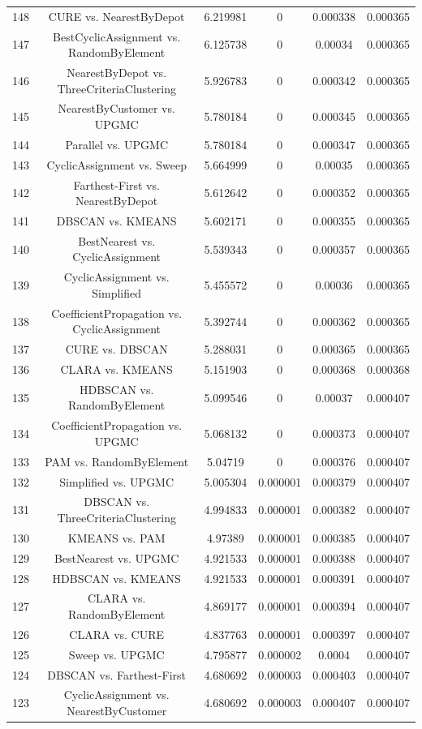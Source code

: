 \documentclass[a4paper,10pt]{article}
\begin{document}
\begin{landscape}
\begin{table}[!htp]
\begin{tabular}{cccccc}
148&CURE vs. NearestByDepot&6.219981&0&0.000338&0.000365\\
147&BestCyclicAssignment vs. RandomByElement&6.125738&0&0.00034&0.000365\\
146&NearestByDepot vs. ThreeCriteriaClustering&5.926783&0&0.000342&0.000365\\
145&NearestByCustomer vs. UPGMC&5.780184&0&0.000345&0.000365\\
144&Parallel vs. UPGMC&5.780184&0&0.000347&0.000365\\
143&CyclicAssignment vs. Sweep&5.664999&0&0.00035&0.000365\\
142&Farthest-First vs. NearestByDepot&5.612642&0&0.000352&0.000365\\
141&DBSCAN vs. KMEANS&5.602171&0&0.000355&0.000365\\
140&BestNearest vs. CyclicAssignment&5.539343&0&0.000357&0.000365\\
139&CyclicAssignment vs. Simplified&5.455572&0&0.00036&0.000365\\
138&CoefficientPropagation vs. CyclicAssignment&5.392744&0&0.000362&0.000365\\
137&CURE vs. DBSCAN&5.288031&0&0.000365&0.000365\\
136&CLARA vs. KMEANS&5.151903&0&0.000368&0.000368\\
135&HDBSCAN vs. RandomByElement&5.099546&0&0.00037&0.000407\\
134&CoefficientPropagation vs. UPGMC&5.068132&0&0.000373&0.000407\\
133&PAM vs. RandomByElement&5.04719&0&0.000376&0.000407\\
132&Simplified vs. UPGMC&5.005304&0.000001&0.000379&0.000407\\
131&DBSCAN vs. ThreeCriteriaClustering&4.994833&0.000001&0.000382&0.000407\\
130&KMEANS vs. PAM&4.97389&0.000001&0.000385&0.000407\\
129&BestNearest vs. UPGMC&4.921533&0.000001&0.000388&0.000407\\
128&HDBSCAN vs. KMEANS&4.921533&0.000001&0.000391&0.000407\\
127&CLARA vs. RandomByElement&4.869177&0.000001&0.000394&0.000407\\
126&CLARA vs. CURE&4.837763&0.000001&0.000397&0.000407\\
125&Sweep vs. UPGMC&4.795877&0.000002&0.0004&0.000407\\
124&DBSCAN vs. Farthest-First&4.680692&0.000003&0.000403&0.000407\\
123&CyclicAssignment vs. NearestByCustomer&4.680692&0.000003&0.000407&0.000407\\

\end{tabular}
\end{table}
\end{landscape}
\end{document}
